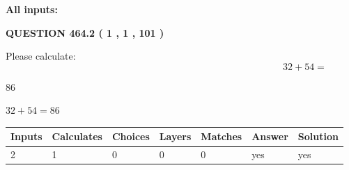 \documentclass[12pt]{article}
\begin{document}
   
   
   
\noindent{}
   
   
   
   
\noindent\vspace{0.1in}\hspace{-0.08in} {\textbf{\Large{All inputs: }}}
   
   
  
\vspace{0.2in}
  
{\textbf{\Large{QUESTION
464.2 
 ( 1 , 1 , 101 )
}}}
  
  
 
Please calculate:
\begin{equation}
32 +  %
54 = \nonumber
\end{equation}
 
 
 
\noindent{}
 
 

86
 
 
\noindent{}
 
 

 
 
 
\noindent{}
 
 

$ %
32 +  %
54=   %
86$
 
 
\noindent{}
 
 

 
   
   
   
   
\noindent\begin{tabular}{|l|l|l|l|l|l|l|}
 \hline
Inputs & Calculates & Choices & Layers & Matches & Answer & Solution \\ \hline
 2  & 
 1  & 
 0
  & 
 0  & 
 0  & 
  yes & 
  yes 
  \\ \hline
 \end{tabular}
   
   
   
   
\noindent{}
   
\end{document}
